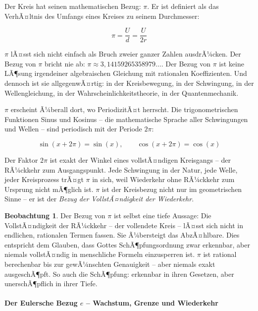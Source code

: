 ﻿\documentclass[a4paper,12pt]{article}
\theoremstyle{definition}
\newtheorem{observation}{Beobachtung}[section]
\begin{document}
Der Kreis hat seinen mathematischen Bezug: $\pi$. Er ist definiert
als das VerhÃ¤ltnis des Umfangs eines Kreises zu seinem Durchmesser:

\begin{equation}
	\pi = \frac{U}{d} = \frac{U}{2r}
\end{equation}

$\pi$ lÃ¤sst sich nicht einfach als Bruch zweier ganzer Zahlen
ausdrÃ¼cken. Der Bezug von $\pi$ bricht nie ab: $\pi \approx 3{,}14159265358979 \ldots$. Der Bezug von $\pi$ ist keine LÃ¶sung irgendeiner algebraischen Gleichung mit rationalen Koeffizienten. Und dennoch ist sie allgegenwÃ¤rtig: in der Kreisbewegung, in der Schwingung, in der Wellengleichung, in der Wahrscheinlichkeitstheorie, in der Quantenmechanik.

$\pi$ erscheint Ã¼berall dort, wo PeriodizitÃ¤t herrscht. Die trigonometrischen
Funktionen Sinus und Kosinus -- die mathematische Sprache aller Schwingungen und
Wellen -- sind periodisch mit der Periode $2\pi$:

\begin{equation}
	\sin(x + 2\pi) = \sin(x), \qquad \cos(x + 2\pi) = \cos(x)
\end{equation}

Der Faktor $2\pi$ ist exakt der Winkel eines vollstÃ¤ndigen Kreisgangs -- der
RÃ¼ckkehr zum Ausgangspunkt. Jede Schwingung in der Natur, jede Welle, jeder
Kreisprozess trÃ¤gt $\pi$ in sich, weil Wiederkehr ohne RÃ¼ckkehr zum Ursprung
nicht mÃ¶glich ist. $\pi$ ist der Kreisbezug nicht nur im geometrischen Sinne --
er ist der \textit{Bezug der VollstÃ¤ndigkeit der Wiederkehr}.

\begin{observation}
	Der Bezug von $\pi$ ist selbst eine tiefe Aussage: Die VollstÃ¤ndigkeit
	der RÃ¼ckkehr -- der vollendete Kreis -- lÃ¤sst sich nicht in endlichen, rationalen
	Termen fassen. Sie Ã¼bersteigt das AbzÃ¤hlbare. Dies entspricht dem Glauben, dass
	Gottes SchÃ¶pfungsordnung zwar erkennbar, aber niemals vollstÃ¤ndig in menschliche
	Formeln einzusperren ist. $\pi$ ist rational berechenbar bis zur gewÃ¼nschten
	Genauigkeit -- aber niemals exakt ausgeschÃ¶pft. So auch die SchÃ¶pfung: erkennbar
	in ihren Gesetzen, aber unerschÃ¶pflich in ihrer Tiefe.
\end{observation}

\paragraph{Der Eulersche Bezug $e$ -- Wachstum, Grenze und Wiederkehr}
\end{document}
